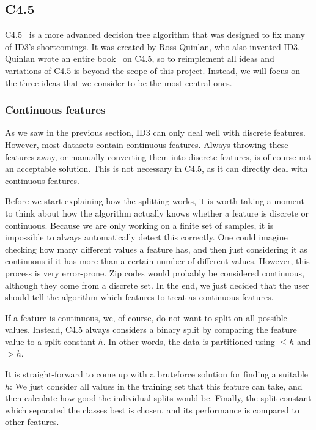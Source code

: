 \documentclass[a4paper]{article}
\begin{document}
\subsection{C4.5}
\label{subsec:c45}

C4.5~\cite{wu2008top, quinlan2014c4, mitchell1997machine} is a more advanced decision tree algorithm that was designed to fix many of ID3's shortcomings. It was created by Ross Quinlan, who also invented ID3. Quinlan wrote an entire book~\cite{quinlan2014c4} on C4.5, so to reimplement all ideas and variations of C4.5 is beyond the scope of this project. Instead, we will focus on the three ideas that we consider to be the most central ones.

\subsubsection{Continuous features}

As we saw in the previous section, ID3 can only deal well with discrete features. However, most datasets contain continuous features. Always throwing these features away, or manually converting them into discrete features, is of course not an acceptable solution. This is not necessary in C4.5, as it can directly deal with continuous features.

Before we start explaining how the splitting works, it is worth taking a moment to think about how the algorithm actually knows whether a feature is discrete or continuous. Because we are only working on a finite set of samples, it is impossible to always automatically detect this correctly. One could imagine checking how many different values a feature has, and then just considering it as continuous if it has more than a certain number of different values. However, this process is very error-prone. Zip codes would probably be considered continuous, although they come from a discrete set. In the end, we just decided that the user should tell the algorithm which features to treat as continuous features.

If a feature is continuous, we, of course, do not want to split on all possible values. Instead, C4.5 always considers a binary split by comparing the feature value to a split constant $h$. In other words, the data is partitioned using $\le h$ and $> h$.

It is straight-forward to come up with a bruteforce solution for finding a suitable $h$: We just consider all values in the training set that this feature can take, and then calculate how good the individual splits would be. Finally, the split constant which separated the classes best is chosen, and its performance is compared to other features.
\end{document}
